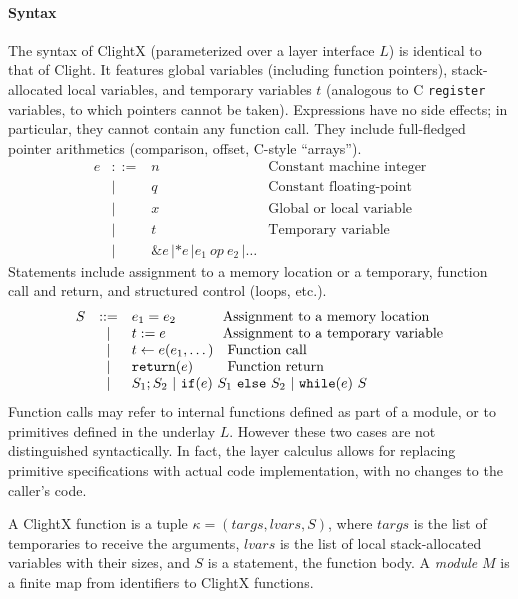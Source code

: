 \paragraph{Syntax} The syntax of ClightX (parameterized over a layer interface
$L$) 
is identical to that of Clight.
It features global variables (including
function pointers), stack-allocated local variables, and
temporary variables $t$ 
(analogous to C \texttt{register} variables, to
which pointers cannot be taken).
Expressions have
no side effects; in particular, they cannot contain any function call.
They include full-fledged pointer arithmetics (comparison, offset, C-style
``arrays'').
\[
\begin{array}{lcll}
e & ::= & n & \text{Constant machine integer} \\
& | & q & \text{Constant floating-point} \\
& | & x & \text{Global or local variable} \\
& | & t & \text{Temporary variable} \\
& | & \texttt{\&}e \, | \texttt{*}e \, | e_1\ \mathit{op}\ e_2 \, | \dots
\end{array}
\]
\noindent{}Statements include assignment to a memory
location or a temporary, function call and return, and 
structured control (loops, etc.).
\[
\begin{array}{lcll}
S & ::= & e_1 = e_2 & \text{\!\!Assignment to a memory location} \\
  & | & t := e & \text{\!\!Assignment to a temporary variable} \\
  & | & t \leftarrow e(e_1, \dots) & \text{Function call} \\
  & | & \texttt{return}(e) & \text{Function return} \\
  & | & \multicolumn{2}{l}{S_1 ; S_2 \ |\ \texttt{if}(e)\ S_1\ \texttt{else}\ S_2\ |\ \texttt{while}(e)\ S} \\
\end{array}
\]
\noindent{}Function calls may refer to internal functions defined as
part of a module, or to primitives defined in the underlay $L$.
However these two cases are not distinguished syntactically.  In fact,
the layer calculus allows for replacing primitive specifications with
actual code implementation, with no changes to the caller's code.

\begin{definition}
A ClightX function is a tuple $\kappa = (\mathit{targs}, \mathit{lvars}, S)$,
where $\mathit{targs}$ is the list of temporaries to receive the
arguments, $\mathit{lvars}$ is the list of local stack-allocated
variables with their sizes, and $S$ is a statement, the function body.
A \emph{module} $M$ is a finite map from identifiers to ClightX functions.
\end{definition}

